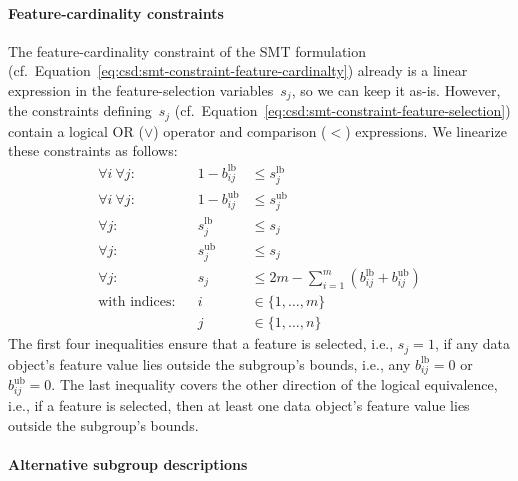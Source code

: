 \documentclass{article}
\theoremstyle{definition}
\begin{document}
\paragraph{Feature-cardinality constraints}

The feature-cardinality constraint of the SMT formulation (cf.~Equation~\ref{eq:csd:smt-constraint-feature-cardinalty}) already is a linear expression in the feature-selection variables~$s_j$, so we can keep it as-is.
However, the constraints defining~$s_j$ (cf.~Equation~\ref{eq:csd:smt-constraint-feature-selection}) contain a logical OR ($\lor$) operator and comparison ($<$) expressions.
We linearize these constraints as follows:
%
\begin{equation}
	\begin{aligned}
		\forall i~\forall j: & & 1 - b^{\text{lb}}_{ij} &\leq s^{\text{lb}}_j \\
		\forall i~\forall j: & & 1 - b^{\text{ub}}_{ij} &\leq s^{\text{ub}}_j \\
		\forall j: & & s^{\text{lb}}_j &\leq s_j \\
		\forall j: & & s^{\text{ub}}_j &\leq s_j \\
		\forall j: & & s_j &\leq 2m - \sum_{i=1}^{m} \left( b^{\text{lb}}_{ij} + b^{\text{ub}}_{ij} \right) \\
		\text{with indices:} & & i &\in \{1, \dots, m\} \\
		& & j &\in \{1, \dots, n\}
	\end{aligned}
	\label{eq:csd:milp-constraint-feature-selection}
\end{equation}
%
The first four inequalities ensure that a feature is selected, i.e., $s_j = 1$, if any data object's feature value lies outside the subgroup's bounds, i.e., any $b^{\text{lb}}_{ij} = 0$ or $b^{\text{ub}}_{ij} = 0$.
The last inequality covers the other direction of the logical equivalence, i.e., if a feature is selected, then at least one data object's feature value lies outside the subgroup's bounds.

\paragraph{Alternative subgroup descriptions}
\end{document}
